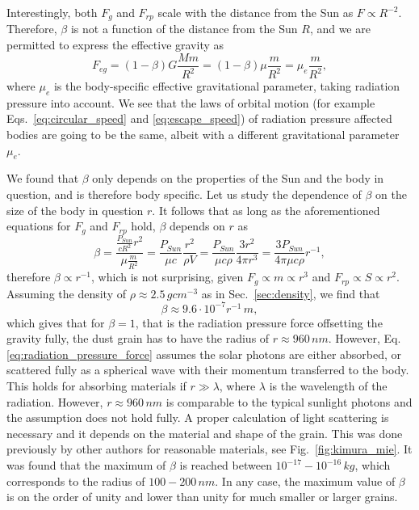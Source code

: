Interestingly, both $F_g$ and $F_{rp}$ scale with the distance from the Sun as $F \propto {R^{-2}}$. Therefore, $\beta$ is not a function of the distance from the Sun $R$, and we are permitted to express the effective gravity as 
\begin{equation}
    F_{eg} = (1-\beta) G \frac{M m}{R^2} = (1-\beta) \mu \frac{m}{R^2} = \mu_{e} \frac{m}{R^2},
    \label{eq:effective_gravity}
\end{equation}
where $\mu_{e}$ is the body-specific effective gravitational parameter, taking radiation pressure into account. We see that the laws of orbital motion (for example Eqs.~\ref{eq:circular_speed} and \ref{eq:escape_speed}) of radiation pressure affected bodies are going to be the same, albeit with a different gravitational parameter $\mu_e$.

We found that $\beta$ only depends on the properties of the Sun and the body in question, and is therefore body specific. Let us study the dependence of $\beta$ on the size of the body in question $r$. It follows that as long as the aforementioned equations for $F_{g}$ and $F_{rp}$ hold, $\beta$ depends on $r$ as 
\begin{equation} 
    \beta = \frac{\frac{P_{Sun}}{c R^2} r^2}{\mu \frac{m}{R^2}} = \frac{P_{Sun}}{\mu c} \frac{r^2}{\rho V} = \frac{P_{Sun}}{\mu c \rho} \frac{3 r^2}{4 \pi r^3} = \frac{3 P_{Sun}}{4 \pi \mu c \rho} r^{-1},
\end{equation}
therefore $\beta \propto r^{-1}$, which is not surprising, given $F_{g} \propto m \propto r^{3}$ and 
$F_{rp} \propto S \propto r^{2}$. Assuming the density of $\rho \approx 2.5 \, \si{gcm^{-3}}$ as in Sec.~\ref{sec:density}, we find that 
\begin{equation}
    \beta \approx 9.6 \cdot 10^{-7} r^{-1} \, \si{m},
    \label{eq:beta_estimate}
\end{equation}
which gives that for $\beta = 1$, that is the radiation pressure force offsetting the gravity fully, the dust grain has to have the radius of $r \approx 960 \, \si{nm}$. However, Eq. \eqref{eq:radiation_pressure_force} assumes the solar photons are either absorbed, or scattered fully as a spherical wave with their momentum transferred to the body. This holds for absorbing materials if $r \gg \lambda$, where $\lambda$ is the wavelength of the radiation. However, $r \approx 960 \, \si{nm}$ is comparable to the typical sunlight photons and the assumption does not hold fully. A proper calculation of light scattering is necessary and it depends on the material and shape of the grain. This was done previously by other authors \cite{kimura2003composition} for reasonable materials, see Fig.~\ref{fig:kimura_mie}. It was found that the maximum of $\beta$ is reached between $10^{-17} - 10^{-16} \, \si{kg}$, which corresponds to the radius of $100 - 200 \, \si{nm}$. In any case, the maximum value of $\beta$ is on the order of unity and lower than unity for much smaller or larger grains.

